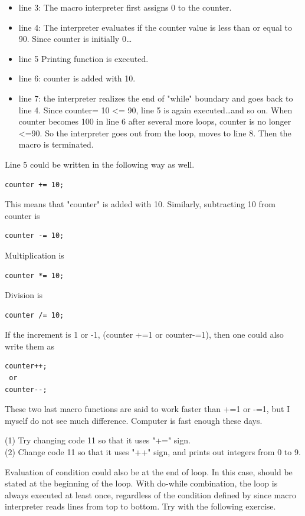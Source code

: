 \begin{itemize}
\item line 3: The macro interpreter first assigns 0 to the counter.
\item line 4: The interpreter evaluates if the counter value is less than or equal to 90. Since counter is initially 0\ldots 
\item line 5 Printing function is executed. 
\item line 6: counter is added with 10. 
\item line 7: the interpreter realizes the end of "while" boundary and goes back to line 4. Since counter= 10 <= 90, line 5 is again executed\ldots and so on. When counter becomes 100 in line 6 after several more loops, counter is no longer <=90. So the interpreter goes out from the loop, moves to line 8. Then the macro is terminated.
\end{itemize}

Line 5 could be written in the following way as well.
\begin{lstlisting}[numbers=none]
counter += 10;
\end{lstlisting}
This means that "counter" is added with 10. Similarly, subtracting 10 from counter is 
\begin{lstlisting}[numbers=none]
counter -= 10;
\end{lstlisting}
Multiplication is 
\begin{lstlisting}[numbers=none]
counter *= 10;
\end{lstlisting}
Division is
\begin{lstlisting}[numbers=none]
counter /= 10;
\end{lstlisting}
If the increment is 1 or -1, (counter +=1 or counter-=1), then one could also write them  as 
\begin{lstlisting}[numbers=none]
counter++;
 or 
counter--;
\end{lstlisting}
These two last macro functions are said to work faster than +=1 or -=1, but I myself do not see much difference. Computer is fast enough these days. 

\begin{indentexercise}{1}
(1) Try changing code 11 so that it uses "+=" sign.\\
(2) Change code 11 so that it uses "++" sign, and prints out integers from 0 to 9.\\
\end{indentexercise}
Evaluation of  condition could also be at the end of loop. In this case,  should be stated at the beginning of the loop. With do-while combination, the loop is always executed at least once, regardless of the condition defined by  since macro interpreter reads lines from top to bottom. Try with the following exercise.

